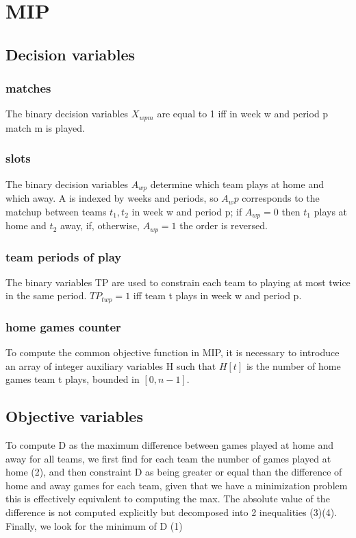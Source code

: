 \documentclass{article}
\begin{document}
\section{MIP}
\subsection{Decision variables}
\subsubsection{matches}
The binary decision variables $X_{wpm}$ are equal to 1 iff in week w and period p match m is played.

\subsubsection{slots}
The binary decision variables $A_{wp}$ determine which team plays at home and which away. A is indexed by weeks and periods, so $A_wp$ corresponds to the matchup between teams $t_1, t_2$ in week w and period p; if $A_{wp} = 0$ then $t_1$ plays at home and $t_2$ away, if, otherwise, $A_{wp} = 1$ the order is reversed.

\subsubsection{team periods of play}
The binary variables TP are used to constrain each team to playing at most twice in the same period. $TP_{twp} = 1$ iff team t plays in week w and period p. 

\subsubsection{home games counter}
To compute the common objective function in MIP, it is necessary to introduce an array of integer auxiliary variables H such that $H[t]$ is the number of home games team t plays, bounded in $[0, n-1]$.

\subsection{Objective variables}
To compute D as the maximum difference between games played at home and away for all teams, we first find for each team the number of games played at home (2), and then constraint D as being greater or equal than the difference of home and away games for each team, given that we have a minimization problem this is effectively equivalent to computing the max. The absolute value of the difference is not computed explicitly but decomposed into 2 inequalities (3)(4). Finally, we look for the minimum of D (1)
\end{document}
